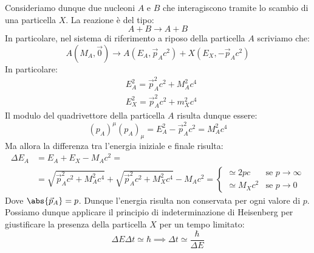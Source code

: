 
Consideriamo dunque due nucleoni $A$ e $B$ che interagiscono tramite lo scambio di una particella $X$. La reazione è del tipo:
\begin{equation}
    A + B \to A + B
\end{equation}
In particolare, nel sistema di riferimento a riposo della particella $A$ scriviamo che:
\begin{equation}
    A(M_A, \vec{0}) \to A(E_A, \vec{p}_A c^2) + X(E_X, -\vec{p}_A c^2)
\end{equation}
In particolare:
\begin{equation}
  \begin{split}
    &E_A^2 = \vec{p}_A^2 c^2 + M_A^2 c^4 \\[8pt]
    &E_X^2 = \vec{p}_A^2 c^2 + m_X^2 c^4
  \end{split}
\end{equation}
Il modulo del quadrivettore della particella $A$ risulta dunque essere:
\begin{equation}
    (p_A)^{\mu} (p_A)_{\mu} = E_A^2 - \vec{p}_A^2 c^2 = M_A^2 c^4
\end{equation}
Ma allora la differenza tra l'energia iniziale e finale risulta:
\begin{equation}
    \begin{split}
        \Delta E_A &=  E_A + E_X - M_A c^2 = \\[8pt]
        &= \sqrt{\vec{p}_A^2 c^2 + M_A^2 c^4} + \sqrt{\vec{p}_A^2 c^2 + M_X^2 c^4} - M_A c^2 =
        \begin{cases}
            \simeq 2pc & \text{se } p \to \infty \\[8pt]
            \simeq M_X c^2 & \text{se } p \to  0
        \end{cases}
    \end{split}
\end{equation}
Dove $\abs{\vec{p}_A} = p$. Dunque l'energia risulta non conservata per ogni valore di $p$. Possiamo dunque applicare il principio di indeterminazione di Heisenberg per giustificare la presenza della particella $X$ per un tempo limitato:
\begin{equation}
    \Delta E \Delta t \simeq \hbar \implies \Delta t \simeq \dfrac{\hbar}{\Delta E}
\end{equation}
